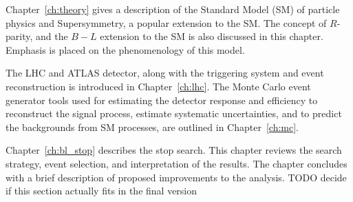Chapter~\ref{ch:theory} gives a description of the Standard Model (SM) of
particle physics and Supersymmetry, a popular extension to the SM.
The concept of $R$-parity, and the $B-L$ extension to the SM is also discussed
in this chapter.
Emphasis is placed on the phenomenology of this model.

The LHC and ATLAS detector, along with the triggering system and event
reconstruction is introduced in Chapter~\ref{ch:lhc}.
The Monte Carlo event generator tools used for estimating the detector
response and efficiency to reconstruct the signal process, estimate systematic
uncertainties, and to predict the backgrounds from SM processes, are outlined
in Chapter~\ref{ch:mc}.

Chapter~\ref{ch:bl_stop} describes the stop search.
This chapter reviews the search strategy, event selection, and interpretation
of the results.
The chapter concludes with a brief description of proposed improvements to the
analysis.
{\color{red} TODO decide if this section actually fits in the final version}
